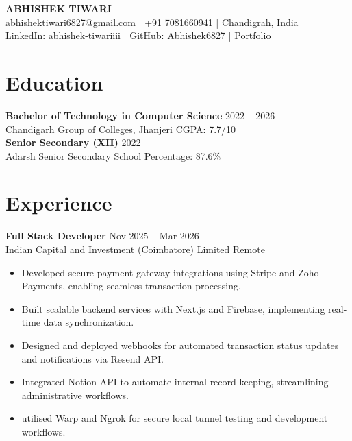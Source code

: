 \documentclass[a4paper,10pt]{article}
\begin{document}
\begin{center}
    {\Huge \textbf{ABHISHEK TIWARI}} \\ \vspace{2mm}
    \href{mailto:abhishektiwari6827@gmail.com}{abhishektiwari6827@gmail.com} | +91 7081660941 | Chandigrah, India \\
    \href{https://www.linkedin.com/in/abhishek-tiwariiii}{LinkedIn: abhishek-tiwariiii} | \href{https://github.com/Abhishek6827}{GitHub: Abhishek6827} | \href{"https://portfolio.getchintu.com"}{Portfolio}
\end{center}

\section{Education}
\textbf{Bachelor of Technology in Computer Science} \hfill 2022 -- 2026 \\
Chandigarh Group of Colleges, Jhanjeri \hfill CGPA: 7.7/10 \\
\vspace{2mm}
\textbf{Senior Secondary (XII)} \hfill 2022 \\
Adarsh Senior Secondary School \hfill Percentage: 87.6\%

\section{Experience}

\textbf{Full Stack Developer} \hfill Nov 2025 -- Mar 2026 \\
Indian Capital and Investment (Coimbatore) Limited \hfill Remote
\begin{itemize}[leftmargin=0.15in, label={-}]
    \item Developed secure payment gateway integrations using Stripe and Zoho Payments, enabling seamless transaction processing.
    \item Built scalable backend services with Next.js and Firebase, implementing real-time data synchronization.
    \item Designed and deployed webhooks for automated transaction status updates and notifications via Resend API.
    \item Integrated Notion API to automate internal record-keeping, streamlining administrative workflows.
    \item utilised Warp and Ngrok for secure local tunnel testing and development workflows.
\end{itemize}
\end{document}
